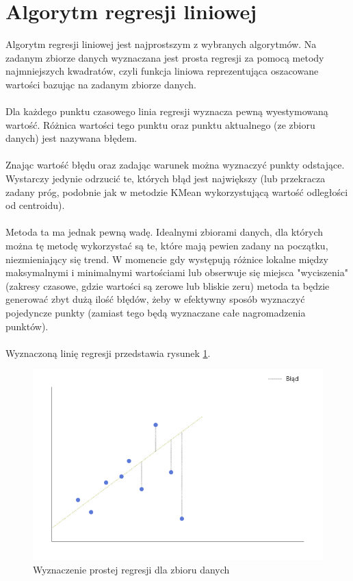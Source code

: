 \documentclass[eng,printmode]{mgr}
\begin{document}
\section{Algorytm regresji liniowej}
Algorytm regresji liniowej jest najprostszym z wybranych algorytmów. Na zadanym zbiorze danych wyznaczana jest prosta regresji za pomocą metody najmniejszych kwadratów, czyli funkcja liniowa reprezentująca oszacowane wartości bazując na zadanym zbiorze danych. 
\\\\
Dla każdego punktu czasowego linia regresji wyznacza pewną wyestymowaną wartość. Różnica wartości tego punktu oraz punktu aktualnego (ze zbioru danych) jest nazywana błędem.
\\\\
Znając wartość błędu oraz zadając warunek można wyznaczyć punkty odstające. Wystarczy jedynie odrzucić te, których błąd jest największy (lub przekracza zadany próg, podobnie jak w metodzie KMean wykorzystującą wartość odległości od centroidu).
\\\\
Metoda ta ma jednak pewną wadę. Idealnymi zbiorami danych, dla których można tę metodę wykorzystać są te, które mają pewien zadany na początku, niezmieniający się trend. W momencie gdy występują różnice lokalne między maksymalnymi i minimalnymi wartościami lub obserwuje się miejsca "wyciszenia" (zakresy czasowe, gdzie wartości są zerowe lub bliskie zeru) metoda ta będzie generować zbyt dużą ilość błędów, żeby w efektywny sposób wyznaczyć pojedyncze punkty (zamiast tego będą wyznaczane całe nagromadzenia punktów).
\\\\
Wyznaczoną linię regresji przedstawia rysunek \ref{fig:linear_reg}.

\begin{figure}[H]
  \begin{center}
  \includegraphics[scale=0.7]{linear_reg}
  \end{center}
  \caption{Wyznaczenie prostej regresji dla zbioru danych}
  \label{fig:linear_reg}
\end{figure}
\end{document}
